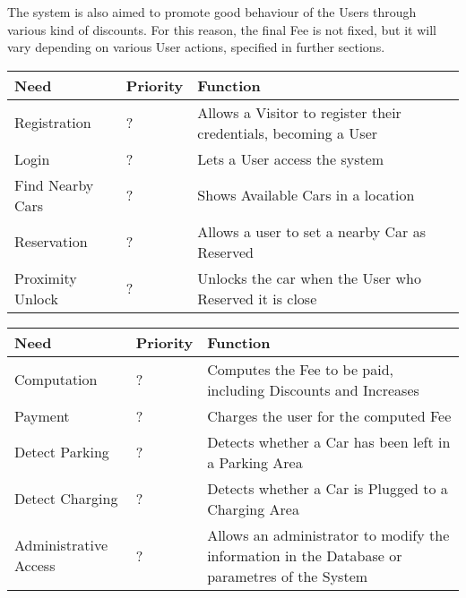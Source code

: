 The system is also aimed to promote good behaviour of the Users through various kind of discounts. For this reason, the final Fee is not fixed, but it will vary depending on various User actions, specified in further sections.


\begin{center}
  \begin{longtable}{|p{}|p{}|p{}|}
    \hline
    \textbf{Need} & \textbf{Priority} & \textbf{Function} \\ \hline
    Registration & ? & Allows a Visitor to register their credentials, becoming a User \\ \hline
    Login & ? & Lets a User access the system \\ \hline
    Find Nearby Cars & ? & Shows Available Cars in a location \\ \hline
    Reservation & ? & Allows a user to set a nearby Car as Reserved \\ \hline
    Proximity Unlock & ? & Unlocks the car when the User who Reserved it is close \\ \hline
  \end{longtable}
\end{center}

\begin{center}
  \begin{longtable}{|p{}|p{}|p{}|}
    \hline
    \textbf{Need} & \textbf{Priority} & \textbf{Function} \\ \hline
    Computation & ? & Computes the Fee to be paid, including Discounts and Increases \\ \hline
    Payment & ? & Charges the user for the computed Fee \\ \hline
    Detect Parking & ? & Detects whether a Car has been left in a Parking Area \\ \hline
    Detect Charging & ? & Detects whether a Car is Plugged to a Charging Area \\ \hline
    Administrative Access & ? & Allows an administrator to modify the information in the Database or parametres of the System \\ \hline
  \end{longtable}
\end{center}

